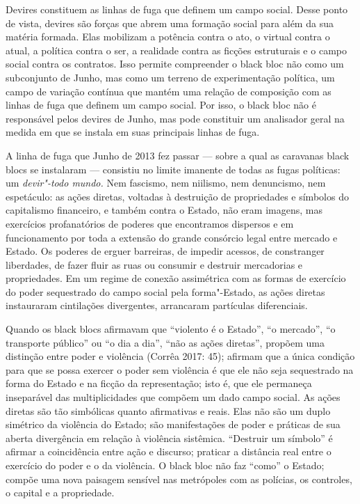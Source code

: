 Devires constituem as linhas de fuga que definem um campo social. Desse
ponto de vista, devires são forças que abrem uma formação social para
além da sua matéria formada. Elas mobilizam a potência contra o ato, o
virtual contra o atual, a política contra o ser, a realidade contra as
ficções estruturais e o campo social contra os contratos. Isso permite
compreender o black bloc não como um subconjunto de Junho, mas
como um terreno de experimentação política, um campo de variação
contínua que mantém uma relação de composição com as linhas de fuga que
definem um campo social. Por isso, o black bloc não é responsável
pelos devires de Junho, mas pode constituir um analisador geral na
medida em que se instala em suas principais linhas de fuga.

A linha de fuga que Junho de 2013 fez passar --- sobre a qual as
caravanas black blocs se instalaram --- consistiu no limite
imanente de todas as fugas políticas: um \emph{devir"-todo mundo.} Nem
fascismo, nem niilismo, nem denuncismo, nem espetáculo: as ações
diretas, voltadas à destruição de propriedades e símbolos do capitalismo
financeiro, e também contra o Estado, não eram imagens, mas exercícios
profanatórios de poderes que encontramos dispersos e em funcionamento
por toda a extensão do grande consórcio legal entre mercado e Estado. Os
poderes de erguer barreiras, de impedir acessos, de constranger
liberdades, de fazer fluir as ruas ou consumir e destruir mercadorias e
propriedades. Em um regime de conexão assimétrica com as formas de
exercício do poder sequestrado do campo social pela forma"-Estado, as
ações diretas instauraram cintilações divergentes, arrancaram partículas
diferenciais.

Quando os black blocs afirmavam que ``violento é o Estado'', ``o
mercado'', ``o transporte público'' ou ``o dia a dia'', ``não as ações
diretas'', propõem uma distinção entre poder e violência (Corrêa 2017:
45); afirmam que a única condição para que se possa exercer o poder sem
violência é que ele não seja sequestrado na forma do Estado e na ficção
da representação; isto é, que ele permaneça inseparável das
multiplicidades que compõem um dado campo social. As ações diretas são
tão simbólicas quanto afirmativas e reais. Elas não são um duplo
simétrico da violência do Estado; são manifestações de poder e práticas
de sua aberta divergência em relação à violência sistêmica. ``Destruir
um símbolo'' é afirmar a coincidência entre ação e discurso; praticar a
distância real entre o exercício do poder e o da violência. O
black bloc não faz ``como'' o Estado; compõe uma nova paisagem
sensível nas metrópoles com as polícias, os controles, o capital e a
propriedade.

